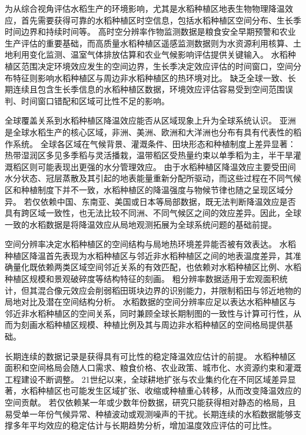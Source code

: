 为从综合视角评估水稻生产的环境影响，尤其是水稻种植区地表生物物理降温效应，首先需要获得可靠的水稻种植区时空信息，包括水稻种植区空间分布、生长季时间边界和持续时间等。
高时空分辨率作物监测数据是粮食安全早期预警和农业生产评估的重要基础\cite{Fritz2019,BeckerReshef2023GEOGLAMBACS}，而高质量水稻种植区遥感监测数据则为水资源利用核算、土地利用变化监测、温室气体排放估算和农业气候影响评估提供关键输入\cite{Dong2016}。
水稻种植区范围决定环境效应发生的空间边界，生长季决定效应评估的时间窗口，空间分布特征则影响水稻种植区与周边非水稻种植区的热环境对比。
缺乏全球一致、长期连续且包含生长季信息的水稻种植区数据，环境效应评估容易受到空间范围误判、时间窗口错配和区域可比性不足的影响。

全球覆盖关系到水稻种植区降温效应能否从区域现象上升为全球系统认识。
亚洲是全球水稻生产的核心区域\cite{GRiSP2013,Yuan2021RiceBowl}，非洲、美洲、欧洲和大洋洲也分布有具有代表性的稻作系统。
全球各区域在气候背景、灌溉条件、田块形态和种植制度上差异显著：热带湿润区多见多季稻与灵活播栽，温带稻区受热量约束以单季稻为主，半干旱灌溉稻区则可能表现出更强的水分管理效应。
由于水稻种植区降温效应主要受田间水分状态、冠层蒸散及其引起的地表能量重新分配所驱动，而这些过程在不同气候区和种植制度下并不一致，水稻种植区的降温强度与物候节律也随之呈现区域分异。
若仅依赖中国、东南亚、美国或日本等局部数据，既无法判断降温效应是否具有跨区域一致性，也无法比较不同洲、不同气候区之间的效应差异。因此，全球一致的水稻数据是将降温效应从局地观测拓展为全球系统问题的基础前提。

空间分辨率决定水稻种植区的空间结构与局地热环境差异能否被有效表达。
水稻种植区降温首先表现为水稻种植区与邻近非水稻种植区之间的地表温度差异，其准确量化既依赖两类区域空间邻近关系的有效匹配，也依赖对水稻种植区比例、水稻种植区规模和景观破碎度等结构特征的刻画。
粗分辨率数据适用于宏观面积统计，但其混合像元效应会削弱稻田斑块边界的识别能力，并限制稻田与邻近地物的局地对比及潜在空间结构分析。
水稻数据的空间分辨率应足以表达水稻种植区与邻近非水稻种植区的空间关系，同时兼顾全球长期制图的一致性与计算可行性，从而为刻画水稻种植区规模、种植比例及其与周边非水稻种植区的空间格局提供基础。

长期连续的数据记录是获得具有可比性的稳定降温效应估计的前提。
水稻种植区面积和空间格局会随人口需求、粮食价格、农业政策、城市化、水资源约束和灌溉工程建设不断调整。
21世纪以来，全球耕地扩张\cite{Potapov2022}与农业集约化\cite{Zabel2019}在不同区域差异显著，水稻种植区也可能发生区域扩张、收缩或种植重心转移，从而改变降温效应的空间贡献。
若仅依赖某一年或少数年份数据，研究只能获得相对静态的格局，且易受单一年份气候异常、种植波动或观测噪声的干扰。长期连续的水稻数据能够支撑多年平均效应的稳定估计与长期趋势分析，增加温度效应评估的可比性。

